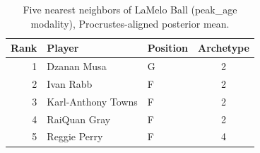\begin{table}[htbp]
  \centering\small
  \begin{tabular}{rllc}
    \toprule
    Rank & Player & Position & Archetype \\
    \midrule
    1 & Dzanan Musa & G & 2 \\
    2 & Ivan Rabb & F & 2 \\
    3 & Karl-Anthony Towns & F & 2 \\
    4 & RaiQuan Gray & F & 2 \\
    5 & Reggie Perry & F & 4 \\
    \bottomrule
  \end{tabular}
  \caption{Five nearest neighbors of LaMelo Ball (peak_age modality), Procrustes-aligned posterior mean.}
  \label{tab:LaMelo_Ball_neighbors_peak_age}
\end{table}

